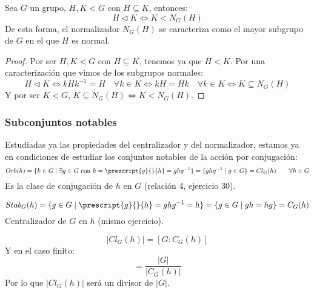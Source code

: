 \begin{prop} %
    Sea $G$ un grupo, $H,K< G$ con $H\subseteq K$, entonces:
    \begin{equation*}
        H \lhd K \Longleftrightarrow K < N_G(H)
    \end{equation*}
    De esta forma, el normalizador $N_G(H)$ se caracteriza como el mayor subgrupo de $G$ en el que $H$ es normal.
    \begin{proof}
        Por ser $H,K<G$ con $H\subseteq K$, tenemos ya que $H<K$. Por una caracterización que vimos de los subgrupos normales:
        \begin{equation*}
            H\lhd K \Longleftrightarrow kHk^{-1} = H \quad \forall k\in K \Longleftrightarrow kH = Hk \quad \forall k\in K \Longleftrightarrow K \subseteq N_G(H) 
        \end{equation*}
        Y por ser $K<G$, $K\subseteq N_G(H) \Longleftrightarrow K<N_G(H)$.
    \end{proof}
\end{prop}

\subsubsection{Subconjuntos notables}
\noindent
Estudiadas ya las propiedades del centralizador y del normalizador, estamos ya en condiciones de estudiar los conjuntos notables de la acción por conjugación:
\begin{equation*}
    Orb(h) = \{k\in G \mid \exists g\in G \text{\ con\ } k = \prescript{g}{}{h} = ghg^{-1}\} = \{ghg^{-1}\mid g\in G\} = Cl_G(h) \qquad \forall h\in G
\end{equation*}
Es la clase de conjugación de $h$ en $G$ (relación 4, ejercicio 30).  %

\begin{equation*}
    Stab_G(h) = \{g\in G \mid \prescript{g}{}{h} = ghg^{-1} = h\} = \{g \in G \mid gh = hg\} = C_G(h)
\end{equation*}
Centralizador de $G$ en $h$ (mismo ejercicio).

\begin{equation*}
    |Cl_G(h)| = [G:C_G(h)]
\end{equation*}
Y en el caso finito:
\begin{equation*}
    [G:C_G(h)] = \dfrac{|G|}{|C_G(h)|}
\end{equation*}
Por lo que $|Cl_G(h)|$ será un divisor de $|G|$.

